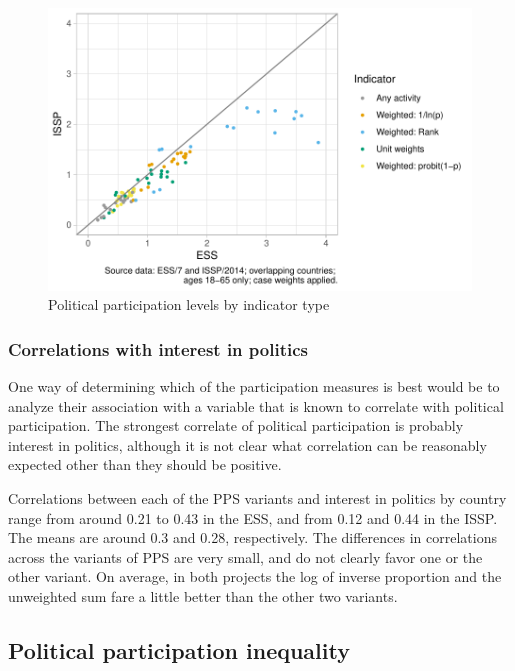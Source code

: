 \documentclass[12pt,]{article}
\begin{document}
\begin{figure}[H]

{\centering \includegraphics{report_files/figure-latex/part-level-dot-plot-1} 

}

\caption{Political participation levels by indicator type}\label{fig:part-level-dot-plot}
\end{figure}

\hypertarget{correlations-with-interest-in-politics}{%
\subsubsection{Correlations with interest in politics}\label{correlations-with-interest-in-politics}}

One way of determining which of the participation measures is best would be to analyze their association with a variable that is known to correlate with political participation. The strongest correlate of political participation is probably interest in politics, although it is not clear what correlation can be reasonably expected other than they should be positive.

Correlations between each of the PPS variants and interest in politics by country range from around 0.21 to 0.43 in the ESS, and from 0.12 and 0.44 in the ISSP. The means are around 0.3 and 0.28, respectively. The differences in correlations across the variants of PPS are very small, and do not clearly favor one or the other variant. On average, in both projects the log of inverse proportion and the unweighted sum fare a little better than the other two variants.

\hypertarget{political-participation-inequality}{%
\subsection{Political participation inequality}\label{political-participation-inequality}}
\end{document}
